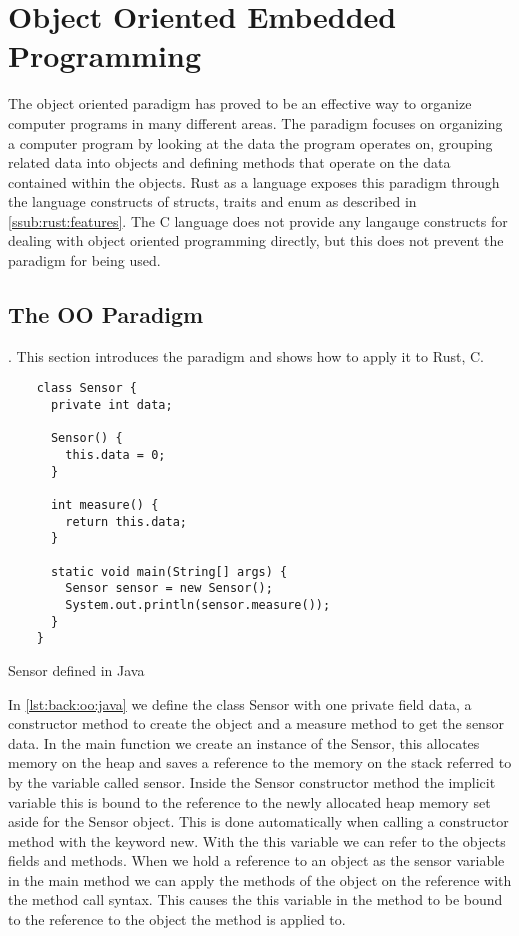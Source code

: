 \section{Object Oriented Embedded Programming}
\label{sec:back:oo}

The object oriented paradigm has proved to be an effective way to organize computer programs in many different areas.
The paradigm focuses on organizing a computer program by looking at the data the program operates on, grouping related data into objects and defining methods that operate on the data contained within the objects.
Rust as a language exposes this paradigm through the language constructs of structs, traits and enum as described in \autoref{ssub:rust:features}.
The C language does not provide any langauge constructs for dealing with object oriented programming directly, but this does not prevent the paradigm for being used.

\subsection{The OO Paradigm}
\label{sec:back:oo_paradigm}.
This section introduces the paradigm and shows how to apply it to Rust, C.

\begin{listing}[H]
  \begin{verbatim}
    class Sensor {
      private int data;

      Sensor() {
        this.data = 0;
      }

      int measure() {
        return this.data;
      }

      static void main(String[] args) {
        Sensor sensor = new Sensor();
        System.out.println(sensor.measure());
      }
    }
  \end{verbatim}
  \caption{Sensor defined in Java}
  \label{lst:back:oo:java}
\end{listing}

In \autoref{lst:back:oo:java} we define the class Sensor with one private field data, a constructor method to create the object and a measure method to get the sensor data.
In the main function we create an instance of the Sensor, this allocates memory on the heap and saves a reference to the memory on the stack referred to by the  variable called sensor.
Inside the Sensor constructor method the implicit variable this is bound to the reference to the newly allocated heap memory set aside for the Sensor object.
This is done automatically when calling a constructor method with the keyword new.
With the this variable we can refer to the objects fields and methods.
When we hold a reference to an object as the sensor variable in the main method we can apply the methods of the object on the reference with the method call syntax.
This causes the this variable in the method to be bound to the reference to the object the method is applied to.

